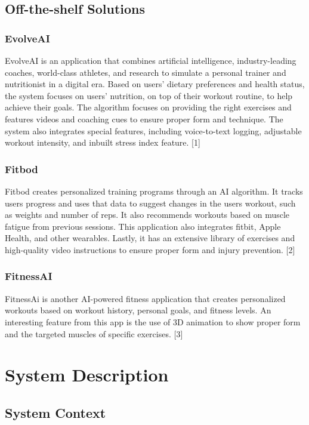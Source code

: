 \documentclass[12pt]{article}
\begin{document}
\subsection{Off-the-shelf Solutions}

\subsubsection{EvolveAI}
EvolveAI is an application that combines artificial intelligence, industry-leading coaches, world-class athletes, and research to simulate a personal trainer and nutritionist in a digital era. Based on users’ dietary preferences and health status, the system focuses on users’ nutrition, on top of their workout routine, to help achieve their goals. The algorithm focuses on providing the right exercises and features videos and coaching cues to ensure proper form and technique. The system also integrates special features, including voice-to-text logging, adjustable workout intensity, and inbuilt stress index feature. [1]

\subsubsection{Fitbod}
Fitbod creates personalized training programs through an AI algorithm. It tracks users progress and uses that data to suggest changes in the users workout, such as weights and number of reps. It also recommends workouts based on muscle fatigue from previous sessions. This application also integrates fitbit, Apple Health, and other wearables. Lastly, it has an extensive library of exercises and high-quality video instructions to ensure proper form and injury prevention. [2]

\subsubsection{FitnessAI}
FitnessAi is another AI-powered fitness application that creates personalized workouts based on workout history, personal goals, and fitness levels. An interesting feature from this app is the use of 3D animation to show proper form and the targeted muscles of specific exercises. [3]

\section{System Description}

\subsection{System Context}
\end{document}
